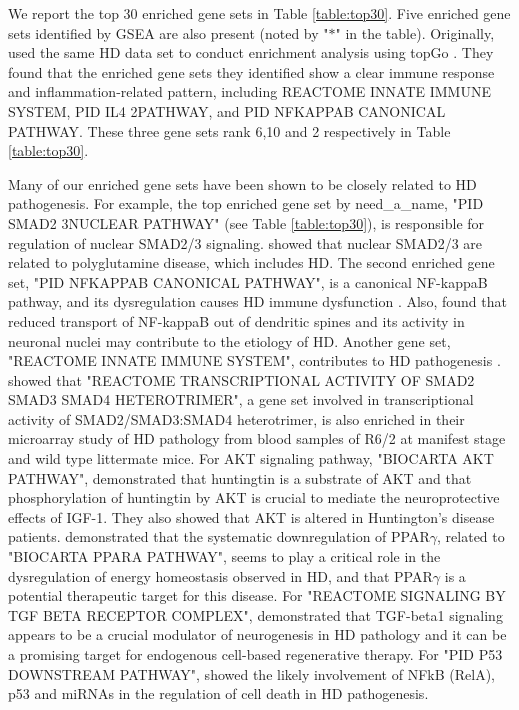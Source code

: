 \documentclass[useAMS,usenatbib, galley]{biom}
\newcommand{\OurMethod}{need\_a\_name}
\begin{document}
	We report the top 30 enriched gene sets in Table \ref{table:top30}. Five enriched gene sets identified by GSEA are also present (noted by "$\ast$" in the table). Originally, \cite{labadorf2015rna} used the same HD data set to conduct enrichment analysis using topGo \citep{alexa2010topgo}. They found that the enriched gene sets they identified show a clear immune response and inflammation-related pattern, including REACTOME INNATE IMMUNE SYSTEM, PID IL4 2PATHWAY, and PID NFKAPPAB CANONICAL PATHWAY. These three gene sets rank 6,10 and 2 respectively in Table \ref{table:top30}.
	
	Many of our enriched gene sets have been shown to be closely related to HD pathogenesis. For example, the top enriched gene set by \OurMethod, "PID SMAD2 3NUCLEAR PATHWAY" (see Table \ref{table:top30}), is responsible for regulation of nuclear SMAD2/3 signaling. \cite{katsuno2010disrupted} showed that nuclear SMAD2/3 are related to polyglutamine disease, which includes HD. The second enriched gene set, "PID NFKAPPAB CANONICAL PATHWAY", is a canonical NF-kappaB pathway, and its dysregulation causes HD immune dysfunction \citep{trager2014htt}. Also, \cite{marcora2010huntington} found that reduced transport of NF-kappaB out of dendritic spines and its activity in neuronal nuclei may contribute to the etiology of HD. 
	Another gene set, "REACTOME INNATE IMMUNE SYSTEM", contributes to HD pathogenesis \citep{trager2014htt, labadorf2015rna}. \cite{diamanti2013whole} showed that "REACTOME TRANSCRIPTIONAL ACTIVITY OF SMAD2 SMAD3 SMAD4 HETEROTRIMER", a gene set involved in transcriptional activity of SMAD2/SMAD3:SMAD4 heterotrimer, is also enriched in their microarray study of HD pathology from blood samples of R6/2 at manifest stage and wild type littermate mice. For AKT signaling pathway, "BIOCARTA AKT PATHWAY", \cite{humbert2002igf} demonstrated that huntingtin is a substrate of AKT and that phosphorylation of huntingtin by AKT is crucial to mediate the neuroprotective effects of IGF-1. They also showed that AKT is altered in Huntington’s disease patients.  
	\cite{chiang2010modulation} demonstrated that the systematic downregulation of PPAR$\gamma$, related to "BIOCARTA PPARA PATHWAY", seems to play a critical role in the dysregulation of energy homeostasis observed in HD, and that PPAR$\gamma$ is a potential therapeutic target for this disease. For "REACTOME SIGNALING BY TGF BETA RECEPTOR COMPLEX",  \cite{kandasamy2011transforming} demonstrated that TGF-beta1 signaling appears to be a crucial modulator of neurogenesis in HD pathology and it can be a promising target for endogenous cell-based regenerative therapy. 
	For "PID P53 DOWNSTREAM PATHWAY", \cite{ghose2011regulation} showed the likely involvement of NFkB (RelA), p53 and miRNAs in the regulation of cell death in HD pathogenesis. 
	
\end{document}
